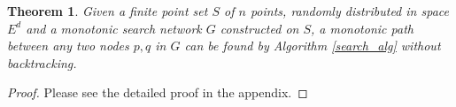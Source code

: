 \documentclass{vldb}
\newtheorem{theorem}{Theorem}
\begin{document}
\begin{theorem}
\label{MSNET_find}
Given a finite point set $S$ of $n$ points, randomly distributed in space $E^d$ and a monotonic search network $G$ constructed on $S$, a monotonic path between any two nodes $p,q$ in $G$ can be found by Algorithm \ref{search_alg} without backtracking. 
\end{theorem}
\begin{proof}
Please see the detailed proof in the appendix. 
\end{proof}
\end{document}
